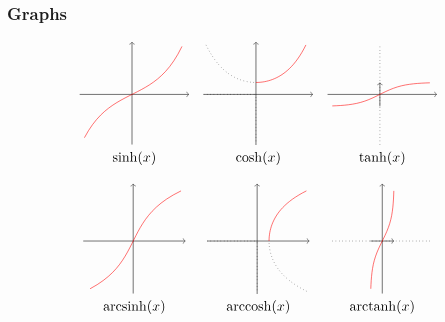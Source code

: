 \documentclass[9pt]{beamer}
\begin{document}
\begin{frame}[t]
 \frametitle{Graphs}
 \vspace{2ex}
 \[ \begin{array}{ccc}
   \begin{tikzpicture}[xscale=0.6,yscale=0.3]
    \draw[->] (-2.2,0) -- (2.4,0);
    \draw[->] (0,-4.2) -- (0,4.4);
    \draw[domain=-2:2.1,color=red]        plot(\x,{(exp(\x)-exp(-\x))/2});
   \end{tikzpicture} &
   \begin{tikzpicture}[xscale=0.6,yscale=0.3]
    \draw[->] (-2.2,0) -- (2.4,0);
    \draw[->] (0,-4.2) -- (0,4.4);
    \draw[dotted] (-2.2,0) -- (0,0);
    \draw[dotted] (0,-4.2) -- (0,0);
    \draw[domain=-2.1:0,style=dotted] plot(\x,{(exp(\x)+exp(-\x))/2});
    \draw[domain=0:2.1,color=red] plot(\x,{(exp(\x)+exp(-\x))/2});
   \end{tikzpicture} &
   \begin{tikzpicture}[xscale=0.6,yscale=0.3]
    \draw[->] (-2.2,0) -- (2.4,0);
    \draw[->] (0,-1) -- (0,1);
    \draw[dotted](0,-4.2) -- (0,4.2);
    \draw[domain=-2:2.1,color=red]%
    plot(\x,{(exp(\x)-exp(-\x))/(exp(\x)+exp(-\x))});
   \end{tikzpicture} \\
   \sinh(x) & \cosh(x) & \tanh(x) \\
   && \\
   \begin{tikzpicture}[xscale=0.3,yscale=0.6]
    \draw[->] (0,-2.2) -- (0,2.4);
    \draw[->] (-4.2,0) -- (4.4,0);
    \draw[domain=-2:2.1,color=red]        plot({(exp(\x)-exp(-\x))/2},\x);
   \end{tikzpicture} &
   \begin{tikzpicture}[xscale=0.3,yscale=0.6]
    \draw[->] (0,-2.2) -- (0,2.4);
    \draw[->] (-4.2,0) -- (4.4,0);
    \draw[dotted] (0,-2.2) -- (0,0);
    \draw[dotted] (-4.2,0) -- (0,0);
    \draw[domain=-2.1:0,style=dotted] plot({(exp(\x)+exp(-\x))/2},\x);
    \draw[domain=0:2.1,color=red] plot({(exp(\x)+exp(-\x))/2},\x);
   \end{tikzpicture} &
   \begin{tikzpicture}[xscale=0.3,yscale=0.6]
    \draw[->] (0,-2.2) -- (0,2.4);
    \draw[->] (-1,0) -- (1,0);
    \draw[dotted](-4.2,0) -- (4.2,0);
    \draw[domain=-2:2.1,color=red]%
    plot({(exp(\x)-exp(-\x))/(exp(\x)+exp(-\x))},\x);
   \end{tikzpicture} \\
   \arcsinh(x) & \arccosh(x) & \arctanh(x) \\
  \end{array} \]
\end{frame}
\end{document}

